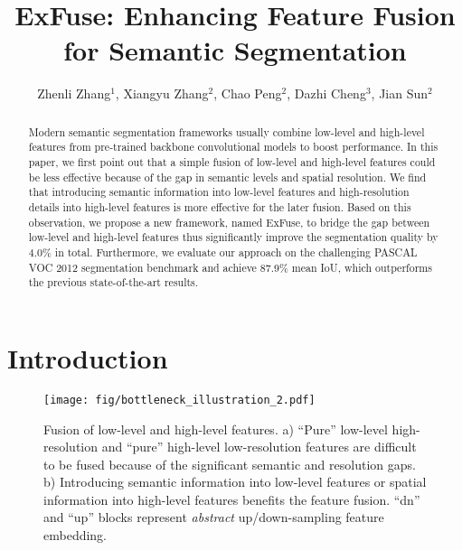 \documentclass[runningheads]{llncs}
\begin{document}
\pagestyle{headings}
\mainmatter
\def\ECCV18SubNumber{1817}  

\title{ExFuse: Enhancing Feature Fusion for Semantic Segmentation} 





\author{Zhenli Zhang$^1$, Xiangyu Zhang$^2$, Chao Peng$^2$, Dazhi Cheng$^3$, Jian Sun$^2$
}



\maketitle

\begin{abstract}
Modern semantic segmentation frameworks usually combine low-level and high-level features from pre-trained backbone convolutional models to boost performance. In this paper, we first point out that a simple fusion of low-level and high-level features could be less effective because of the gap in semantic levels and spatial resolution. We find that introducing semantic information into low-level features and high-resolution details into high-level features is more effective for the later fusion. Based on this observation, we propose a new framework, named ExFuse, to bridge the gap between low-level and high-level features thus significantly improve the segmentation quality by 4.0\% in total. Furthermore, we evaluate our approach on the challenging PASCAL VOC 2012 segmentation benchmark and achieve 87.9\% mean IoU, which outperforms the previous state-of-the-art results.
\end{abstract}


\section{Introduction}
\label{sec:introduction}

\begin{figure}[htbp]
	\centering
	\texttt{[image: fig/bottleneck\_illustration\_2.pdf]}
	\caption{Fusion of low-level and high-level features. a) ``Pure'' low-level high-resolution and ``pure'' high-level low-resolution features are difficult to be fused because of the significant semantic and resolution gaps. b) Introducing semantic information into low-level features or spatial information into high-level features benefits the feature fusion. ``dn'' and ``up'' blocks represent \emph{abstract} up/down-sampling feature embedding.}
	\label{fig:concept}
\end{figure}
\end{document}
